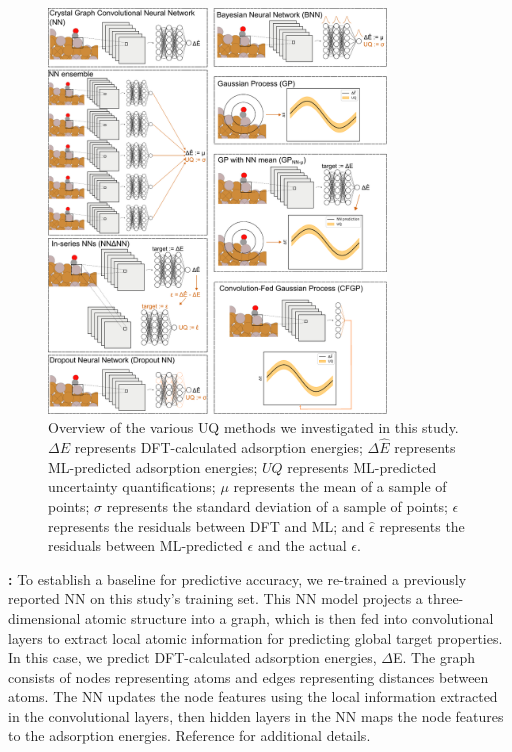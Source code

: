 \documentclass[]{achemso}
\begin{document}
\begin{figure}
    \centering
    \includegraphics[width=0.8\textwidth]{methods/methods.pdf}
    \caption{Overview of the various \gls{UQ} methods we investigated in this study.
    $\Delta E$ represents \gls{DFT}-calculated adsorption energies;
    $\Delta \hat{E}$ represents \gls{ML}-predicted adsorption energies;
    $UQ$ represents \gls{ML}-predicted uncertainty quantifications;
    $\mu$ represents the mean of a sample of points;
    $\sigma$ represents the standard deviation of a sample of points;
    $\epsilon$ represents the residuals between \gls{DFT} and \gls{ML};
    and $\hat{\epsilon}$ represents the residuals between \gls{ML}-predicted $\epsilon$ and the actual $\epsilon$.
    }\label{fig:methods}
\end{figure}

\textbf{:}
To establish a baseline for predictive accuracy, we re-trained a previously reported \gls{NN}\cite{Xie2018, Back2019} on this study's training set.
This \gls{NN} model projects a three-dimensional atomic structure into a graph, which is then fed into convolutional layers to extract local atomic information for predicting global target properties.
In this case, we predict \gls{DFT}-calculated adsorption energies, $\Delta$E.
The graph consists of nodes representing atoms and edges representing distances between atoms. 
The \gls{NN} updates the node features using the local information extracted in the convolutional layers, then hidden layers in the \gls{NN} maps the node features to the adsorption energies.
Reference \citet{Back2019} for additional details.
\end{document}
